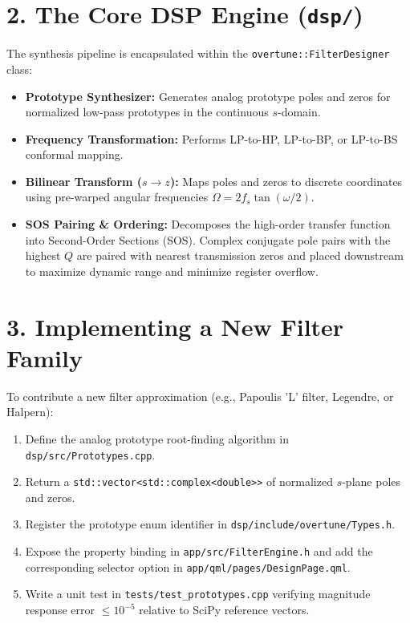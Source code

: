 \documentclass[11pt,a4paper]{article}
\begin{document}
\vspace{6pt}
\section*{2. The Core DSP Engine (\texttt{dsp/})}

The synthesis pipeline is encapsulated within the \texttt{overtune::FilterDesigner} class:
\begin{itemize}[leftmargin=20pt,itemsep=2pt]
\item \textbf{Prototype Synthesizer:} Generates analog prototype poles and zeros for normalized low-pass prototypes in the continuous $s$-domain.
\item \textbf{Frequency Transformation:} Performs LP-to-HP, LP-to-BP, or LP-to-BS conformal mapping.
\item \textbf{Bilinear Transform ($s \to z$):} Maps poles and zeros to discrete coordinates using pre-warped angular frequencies $\Omega = 2 f_s \tan(\omega / 2)$.
\item \textbf{SOS Pairing \& Ordering:} Decomposes the high-order transfer function into Second-Order Sections (SOS). Complex conjugate pole pairs with the highest $Q$ are paired with nearest transmission zeros and placed downstream to maximize dynamic range and minimize register overflow.
\end{itemize}

\section*{3. Implementing a New Filter Family}

To contribute a new filter approximation (e.g., Papoulis 'L' filter, Legendre, or Halpern):
\begin{enumerate}[leftmargin=20pt,itemsep=2pt]
\item Define the analog prototype root-finding algorithm in \texttt{dsp/src/Prototypes.cpp}.
\item Return a \texttt{std::vector<std::complex<double>>} of normalized $s$-plane poles and zeros.
\item Register the prototype enum identifier in \texttt{dsp/include/overtune/Types.h}.
\item Expose the property binding in \texttt{app/src/FilterEngine.h} and add the corresponding selector option in \texttt{app/qml/pages/DesignPage.qml}.
\item Write a unit test in \texttt{tests/test\_prototypes.cpp} verifying magnitude response error $\le 10^{-5}$ relative to SciPy reference vectors.
\end{enumerate}
\end{document}
